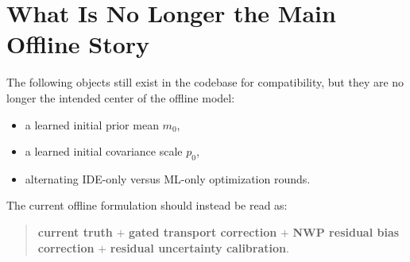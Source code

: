 \documentclass[11pt,a4paper]{article}
\begin{document}
\section{What Is No Longer the Main Offline Story}

The following objects still exist in the codebase for compatibility, but they are no longer the intended center of the offline model:
\begin{itemize}
  \item a learned initial prior mean $m_0$,
  \item a learned initial covariance scale $p_0$,
  \item alternating IDE-only versus ML-only optimization rounds.
\end{itemize}

The current offline formulation should instead be read as:
\begin{quote}
\textbf{current truth} $+$ \textbf{gated transport correction} $+$ \textbf{NWP residual bias correction} $+$ \textbf{residual uncertainty calibration}.
\end{quote}
\end{document}
